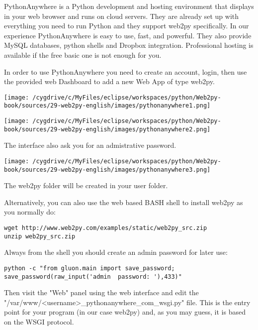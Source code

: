 \documentclass[justified,sixbynine,notoc]{tufte-book}
\begin{document}
\begin{fullwidth}
PythonAnywhere is a Python development and hosting environment that displays in your web browser and runs on cloud servers. They are already set up with everything you need to run Python
and they support web2py specifically. In our experience PythonAnywhere is easy to use, fast, and powerful. They also provide MySQL databases, python shells and Dropbox integration.
Professional hosting is available if the free basic one is not enough for you.

In order to use PythonAnywhere you need to create an account, login, then use the provided web Dashboard to add a new Web App of type web2py.


\goodbreak\begin{center}\texttt{[image: /cygdrive/c/MyFiles/eclipse/workspaces/python/Web2py-book/sources/29-web2py-english/images/pythonanywhere1.png]}\end{center}


\goodbreak\begin{center}\texttt{[image: /cygdrive/c/MyFiles/eclipse/workspaces/python/Web2py-book/sources/29-web2py-english/images/pythonanywhere2.png]}\end{center}


The interface also ask you for an admistrative password.


\goodbreak\begin{center}\texttt{[image: /cygdrive/c/MyFiles/eclipse/workspaces/python/Web2py-book/sources/29-web2py-english/images/pythonanywhere3.png]}\end{center}


The web2py folder will be created in your user folder.

Alternatively, you can also use the web based BASH shell to install web2py as you normally do:

\begin{lstlisting}
wget http://www.web2py.com/examples/static/web2py_src.zip
unzip web2py_src.zip
\end{lstlisting}

Always from the shell you should create an admin password for later use:

\begin{lstlisting}
python -c "from gluon.main import save_password; save_password(raw_input('admin  password: '),433)"
\end{lstlisting}

Then visit the "Web" panel using the web interface and edit the "/var/www/<username>\_pythonanywhere\_com\_wsgi.py" file. This is the entry point for your program (in our case web2py) and, as you may guess, it is based on the WSGI protocol.


\end{fullwidth}
\end{document}
